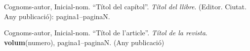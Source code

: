 \documentclass[a4paper,12pt,spanish,final]{epsc_tfc_pfc}
\begin{document}
\begin{thebibliography}{2}


Cognoms-autor, Inicial-nom.
``Títol del capítol''. {\it Títol del llibre}.
(Editor. Ciutat. Any publicació): pagina1--paginaN.

Cognoms-autor, Inicial-nom.
``Títol de l'article''. {\it Títol de la revista}.
{\bf volum}(numero),
pagina1--paginaN. (Any publicació)

\end{thebibliography}
\end{document}
